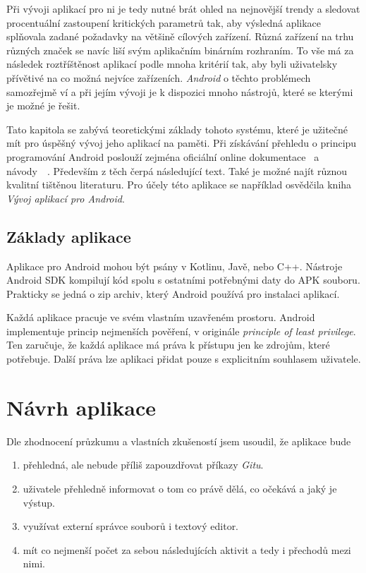 Při vývoji aplikací pro ni je tedy nutné brát ohled na nejnovější trendy a sledovat procentuální zastoupení kritických parametrů tak, aby výsledná aplikace splňovala zadané požadavky na většině cílových zařízení. Různá zařízení na trhu různých značek se navíc liší svým aplikačním binárním rozhraním. To vše má za následek roztříštěnost aplikací podle mnoha kritérií tak, aby byli uživatelsky přívětivé na co možná nejvíce zařízeních. \emph{Android} o těchto problémech samozřejmě ví a při jejím vývoji je k dispozici mnoho nástrojů, které se kterými je možné je řešit.

Tato kapitola se zabývá teoretickými základy tohoto systému, které je užitečné mít pro úspěšný vývoj jeho aplikací na paměti. Při získávání přehledu o principu programování Android poslouží zejména oficiální online dokumentace~ a návody~~. Především z těch čerpá následující text. Také je možné najít různou kvalitní tištěnou literaturu. Pro účely této aplikace se například osvědčila kniha \emph{Vývoj aplikací pro Android}\cite{android-Lacko}. 

\section{Základy aplikace}
Aplikace pro Android mohou být psány v Kotlinu, Javě, nebo C++. Nástroje Android SDK kompilují kód spolu s ostatními potřebnými daty do APK souboru. Prakticky se jedná o zip archiv, který Android používá pro instalaci aplikací.

Každá aplikace pracuje ve svém vlastním uzavřeném prostoru. Android implementuje princip nejmenších pověření, v originále \emph{principle of least privilege}. Ten zaručuje, že každá aplikace má práva k přístupu jen ke zdrojům, které potřebuje. Další práva lze aplikaci přidat pouze s explicitním souhlasem uživatele.



\chapter{Návrh aplikace}
Dle zhodnocení průzkumu a vlastních zkušeností jsem usoudil, že aplikace bude
\begin{enumerate}
    \item přehledná, ale nebude příliš zapouzdřovat příkazy \emph{Gitu}.
    \item uživatele přehledně informovat o tom co právě dělá, co očekává a jaký je výstup.
    \item využívat externí správce souborů i textový editor.
    \item mít co nejmenší počet za sebou následujících aktivit a tedy i přechodů mezi nimi.
\end{enumerate}

